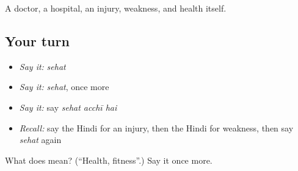 \begin{grammarlens}[title={What you've built}]
A doctor, a hospital, an injury, weakness, and health itself.
\end{grammarlens}

\subsection*{Your turn}
\begin{itemize}
\raggedright
  \item \emph{Say it:} \emph{sehat}
  \item \emph{Say it:} \emph{sehat}, once more
  \item \emph{Say it:} say \emph{sehat acchī hai}
  \item \emph{Recall:} say the Hindi for an injury, then the Hindi for weakness, then say \emph{sehat} again
\end{itemize}

\begin{tcolorbox}[breakable,colback=teal!4,colframe=teal!35!black,title={Before you move on}]
What does  mean? (\textquotedblleft{}Health, fitness\textquotedblright{}.) Say it once more.
\end{tcolorbox}

